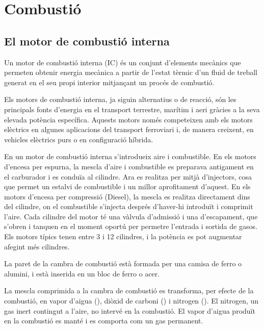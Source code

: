 \chapter{Combustió}
 
\tableofcontents\newpage

\section{El motor de combustió interna}

Un motor de combustió interna (IC) és un conjunt d'elements mecànics que permeten obtenir energia mecànica a partir de l'estat tèrmic d'un fluid de treball generat en el seu propi interior mitjançant un procés de combustió.
 
Els motors de combustió interna, ja siguin alternatius o de reacció, són les principals fonts d'energia en el transport terrestre, marítim i aeri gràcies a la seva elevada potència específica. Aquests motors només competeixen amb els motors elèctrics en algunes aplicacions del transport ferroviari i, de manera creixent, en vehicles elèctrics purs o en configuració híbrida\cite{de_antonio_motores_2015}. 

En un motor de combusti\'o interna s'introdueix aire i combustible. En els motors d'encesa per espurna, la mescla d'aire i combustible es preparava antigament en el carburador i es condu\"ia al cilindre. Ara es realitza per mitj\`a d'injectors, cosa que permet un estalvi de combustible i un millor aprofitament d'aquest. En els motors d'encesa per compressi\'o (Diesel), la mescla es realitza directament dins del cilindre, on el combustible s'injecta despr\'es d'haver-hi introdu\"it i comprimit l'aire. Cada cilindre del motor t\'e una v\`alvula d'admissi\'o i una d'escapament, que s'obren i tanquen en el moment oport\'u per permetre l'entrada i sortida de gasos. Els motors típics tenen entre 3 i 12 cilindres, i la pot\`encia es pot augmentar afegint m\'es cilindres.

La paret de la cambra de combustió està formada per una camisa de ferro o alumini, i està inserida en un bloc de ferro o acer.

La mescla comprimida a la cambra de combusti\'o es transforma, per efecte de la combusti\'o, en vapor d'aigua (), di\`oxid de carboni () i nitrogen (). El nitrogen, un gas inert contingut a l'aire, no interv\'e en la combusti\'o. El vapor d'aigua produ\"it en la combusti\'o es mant\'e i es comporta com un gas permanent.

